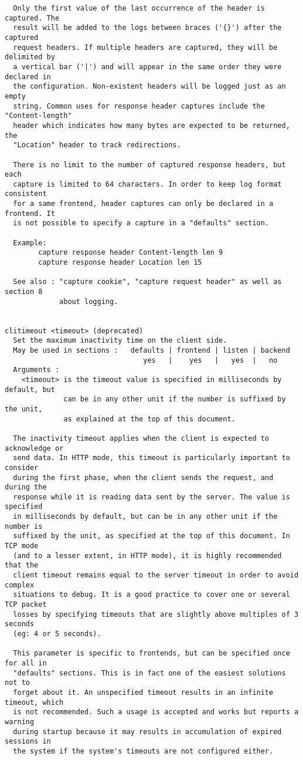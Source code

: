 \begin{verbatim}
  Only the first value of the last occurrence of the header is captured. The
  result will be added to the logs between braces ('{}') after the captured
  request headers. If multiple headers are captured, they will be delimited by
  a vertical bar ('|') and will appear in the same order they were declared in
  the configuration. Non-existent headers will be logged just as an empty
  string. Common uses for response header captures include the "Content-length"
  header which indicates how many bytes are expected to be returned, the
  "Location" header to track redirections.

  There is no limit to the number of captured response headers, but each
  capture is limited to 64 characters. In order to keep log format consistent
  for a same frontend, header captures can only be declared in a frontend. It
  is not possible to specify a capture in a "defaults" section.

  Example:
        capture response header Content-length len 9
        capture response header Location len 15

  See also : "capture cookie", "capture request header" as well as section 8
             about logging.


clitimeout <timeout> (deprecated)
  Set the maximum inactivity time on the client side.
  May be used in sections :   defaults | frontend | listen | backend
                                 yes   |    yes   |   yes  |   no
  Arguments :
    <timeout> is the timeout value is specified in milliseconds by default, but
              can be in any other unit if the number is suffixed by the unit,
              as explained at the top of this document.

  The inactivity timeout applies when the client is expected to acknowledge or
  send data. In HTTP mode, this timeout is particularly important to consider
  during the first phase, when the client sends the request, and during the
  response while it is reading data sent by the server. The value is specified
  in milliseconds by default, but can be in any other unit if the number is
  suffixed by the unit, as specified at the top of this document. In TCP mode
  (and to a lesser extent, in HTTP mode), it is highly recommended that the
  client timeout remains equal to the server timeout in order to avoid complex
  situations to debug. It is a good practice to cover one or several TCP packet
  losses by specifying timeouts that are slightly above multiples of 3 seconds
  (eg: 4 or 5 seconds).

  This parameter is specific to frontends, but can be specified once for all in
  "defaults" sections. This is in fact one of the easiest solutions not to
  forget about it. An unspecified timeout results in an infinite timeout, which
  is not recommended. Such a usage is accepted and works but reports a warning
  during startup because it may results in accumulation of expired sessions in
  the system if the system's timeouts are not configured either.


\end{verbatim}
